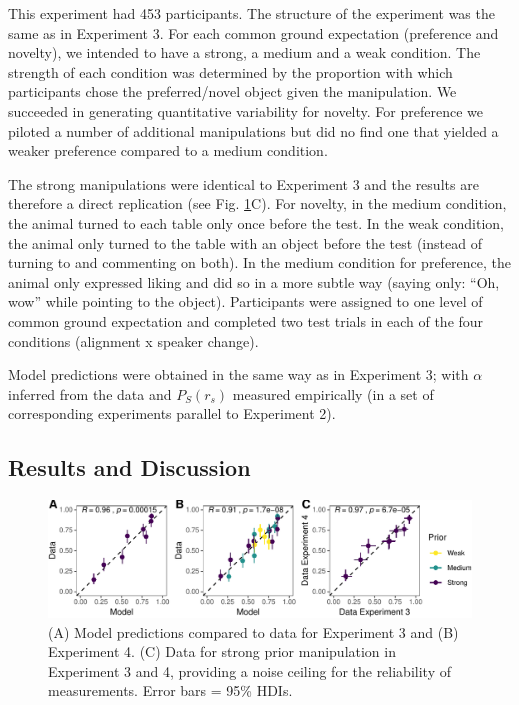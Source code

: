 \documentclass[10pt, letterpaper]{article}
\newenvironment{CodeChunk}{}{}
\begin{document}
This experiment had 453 participants. The structure of the experiment
was the same as in Experiment 3. For each common ground expectation
(preference and novelty), we intended to have a strong, a medium and a
weak condition. The strength of each condition was determined by the
proportion with which participants chose the preferred/novel object
given the manipulation. We succeeded in generating quantitative
variability for novelty. For preference we piloted a number of
additional manipulations but did no find one that yielded a weaker
preference compared to a medium condition.

The strong manipulations were identical to Experiment 3 and the results
are therefore a direct replication (see Fig. \ref{fig:plotmodelcomp}C).
For novelty, in the medium condition, the animal turned to each table
only once before the test. In the weak condition, the animal only turned
to the table with an object before the test (instead of turning to and
commenting on both). In the medium condition for preference, the animal
only expressed liking and did so in a more subtle way (saying only:
``Oh, wow'' while pointing to the object). Participants were assigned to
one level of common ground expectation and completed two test trials in
each of the four conditions (alignment x speaker change).

Model predictions were obtained in the same way as in Experiment 3; with
\(\alpha\) inferred from the data and \(P_S(r_s)\) measured empirically
(in a set of corresponding experiments parallel to Experiment 2).

\subsection{Results and Discussion}\label{results-and-discussion-3}

\begin{CodeChunk}
\begin{figure}[h]

{\centering \includegraphics{figs/plotmodelcomp-1} 

}

\caption[(A) Model predictions compared to data for Experiment 3 and (B) Experiment 4]{(A) Model predictions compared to data for Experiment 3 and (B) Experiment 4. (C) Data for strong prior manipulation in Experiment 3 and 4, providing a noise ceiling for the reliability of measurements. Error bars = 95\% HDIs.}\label{fig:plotmodelcomp}
\end{figure}
\end{CodeChunk}
\end{document}
